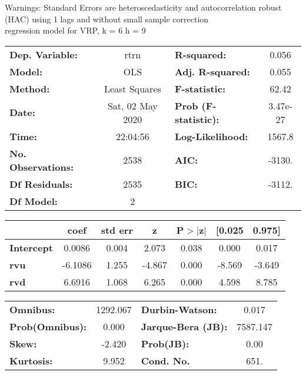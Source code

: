 Warnings: \newline
 [1] Standard Errors are heteroscedasticity and autocorrelation robust (HAC) using 1 lags and without small sample correction\\ 

regression model for VRP, k = 6 h = 9\begin{center}
\begin{tabular}{lclc}
\toprule
\textbf{Dep. Variable:}    &       rtrn       & \textbf{  R-squared:         } &     0.056   \\
\textbf{Model:}            &       OLS        & \textbf{  Adj. R-squared:    } &     0.055   \\
\textbf{Method:}           &  Least Squares   & \textbf{  F-statistic:       } &     62.42   \\
\textbf{Date:}             & Sat, 02 May 2020 & \textbf{  Prob (F-statistic):} &  3.47e-27   \\
\textbf{Time:}             &     22:04:56     & \textbf{  Log-Likelihood:    } &    1567.8   \\
\textbf{No. Observations:} &        2538      & \textbf{  AIC:               } &    -3130.   \\
\textbf{Df Residuals:}     &        2535      & \textbf{  BIC:               } &    -3112.   \\
\textbf{Df Model:}         &           2      & \textbf{                     } &             \\
\bottomrule
\end{tabular}
\begin{tabular}{lcccccc}
                   & \textbf{coef} & \textbf{std err} & \textbf{z} & \textbf{P$> |$z$|$} & \textbf{[0.025} & \textbf{0.975]}  \\
\midrule
\textbf{Intercept} &       0.0086  &        0.004     &     2.073  &         0.038        &        0.000    &        0.017     \\
\textbf{rvu}       &      -6.1086  &        1.255     &    -4.867  &         0.000        &       -8.569    &       -3.649     \\
\textbf{rvd}       &       6.6916  &        1.068     &     6.265  &         0.000        &        4.598    &        8.785     \\
\bottomrule
\end{tabular}
\begin{tabular}{lclc}
\textbf{Omnibus:}       & 1292.067 & \textbf{  Durbin-Watson:     } &    0.017  \\
\textbf{Prob(Omnibus):} &   0.000  & \textbf{  Jarque-Bera (JB):  } & 7587.147  \\
\textbf{Skew:}          &  -2.420  & \textbf{  Prob(JB):          } &     0.00  \\
\textbf{Kurtosis:}      &   9.952  & \textbf{  Cond. No.          } &     651.  \\
\bottomrule
\end{tabular}
\end{center}


